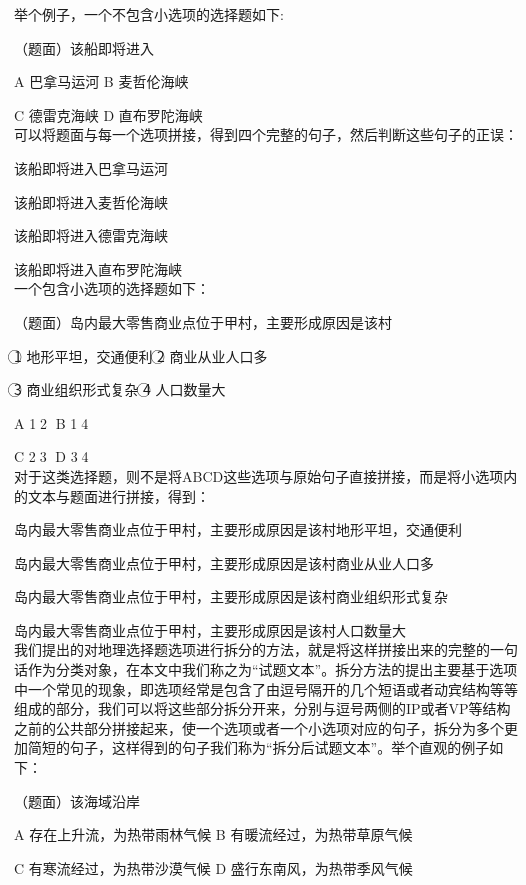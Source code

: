 \documentclass[master, winfont]{njuthesis}
\begin{document}
举个例子，一个不包含小选项的选择题如下:\par
（题面）该船即将进入\par
A 巴拿马运河   B 麦哲伦海峡\par
C 德雷克海峡   D 直布罗陀海峡\\


可以将题面与每一个选项拼接，得到四个完整的句子，然后判断这些句子的正误：\par
该船即将进入巴拿马运河\par
该船即将进入麦哲伦海峡\par
该船即将进入德雷克海峡\par
该船即将进入直布罗陀海峡\\

一个包含小选项的选择题如下：\par
（题面）岛内最大零售商业点位于甲村，主要形成原因是该村 \par
\textcircled{1} 地形平坦，交通便利   \textcircled{2} 商业从业人口多\par
\textcircled{3} 商业组织形式复杂     \textcircled{4} 人口数量大  \par
A \textcircled{1}\textcircled{2}  B \textcircled{1}\textcircled{4}\par
C \textcircled{2}\textcircled{3}  D \textcircled{3}\textcircled{4}\\

对于这类选择题，则不是将ABCD这些选项与原始句子直接拼接，而是将小选项内的文本与题面进行拼接，得到：\par
岛内最大零售商业点位于甲村，主要形成原因是该村地形平坦，交通便利\par
岛内最大零售商业点位于甲村，主要形成原因是该村商业从业人口多\par
岛内最大零售商业点位于甲村，主要形成原因是该村商业组织形式复杂\par
岛内最大零售商业点位于甲村，主要形成原因是该村人口数量大\\

我们提出的对地理选择题选项进行拆分的方法，就是将这样拼接出来的完整的一句话作为分类对象，在本文中我们称之为“试题文本”。拆分方法的提出主要基于选项中一个常见的现象，即选项经常是包含了由逗号隔开的几个短语或者动宾结构等等组成的部分，我们可以将这些部分拆分开来，分别与逗号两侧的IP或者VP等结构之前的公共部分拼接起来，使一个选项或者一个小选项对应的句子，拆分为多个更加简短的句子，这样得到的句子我们称为“拆分后试题文本”。举个直观的例子如下：

（题面）该海域沿岸 \par
A 存在上升流，为热带雨林气候   B 有暖流经过，为热带草原气候\par
C 有寒流经过，为热带沙漠气候   D 盛行东南风，为热带季风气候\\
\end{document}
